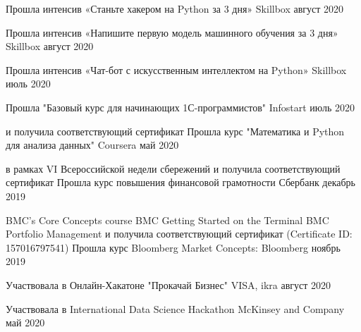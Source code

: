 \documentclass[]{awesome-cv}
\begin{document}
\begin{cventries}
	\cventry
		{}
	{Прошла интенсив «Станьте хакером на Python за 3 дня»}
	{Skillbox}
	{август 2020}
	{}
	\end{cventries} \vspace{-5mm}\begin{cventries}
	\cventry
		{}
	{Прошла интенсив «Напишите первую модель машинного обучения за 3 дня»}
	{Skillbox}
	{август 2020}
	{}
	\end{cventries} \vspace{-5mm}\begin{cventries}
	\cventry
		{}
	{Прошла интенсив «Чат-бот с искусственным интеллектом на Python»}
	{Skillbox}
	{июль 2020}
	{}
	\end{cventries} \vspace{-5mm}\begin{cventries}
	\cventry
		{}
	{Прошла "Базовый курс для начинающих 1С-программистов" }
	{Infostart}
	{июль 2020}
	{}
	\end{cventries} \vspace{-5mm}\begin{cventries}
	\cventry
	{и получила соответствующий сертификат}
	{Прошла курс "Математика и Python для анализа данных" }
	{Coursera}
	{май 2020}
	{}
	\end{cventries} \vspace{-5mm} \begin{cventries}
	\cventry
{в рамках VI Всероссийской недели сбережений и получила соответствующий сертификат}
	{Прошла курс повышения финансовой грамотности}
	{Сбербанк}
	{декабрь 2019}
	{}
	\end{cventries}\vspace{-5mm}  \begin{cventries}
	
	\cventry
		{\quad \bullet BMC's Core Concepts course
	\newline \quad \bullet BMC Getting Started on the Terminal
	\newline \quad \bullet BMC Portfolio Management
	\newline \quad и получила соответствующий сертификат (Certificate ID: 157016797541)}
	{Прошла курс Bloomberg Market Concepts:}
	{Bloomberg}
	{ноябрь 2019}
	{}
	\end{cventries} 
	\vspace{-5mm}


\begin{cventries}
	\cventry
	{}
	{Участвовала в Онлайн-Хакатоне "Прокачай Бизнес"}
	{VISA, ikra}
	{август 2020}
	{}
	\end{cventries}  \vspace{-5mm} \begin{cventries}
	\cventry	
	{}
	{Участвовала в International Data Science Hackathon}
	{McKinsey and Company}
	{май 2020}
	{}
		\end{cventries}  \vspace{-5mm}
\end{document}
